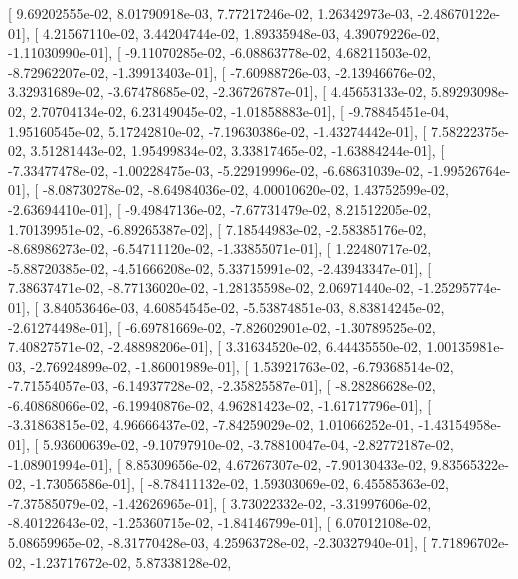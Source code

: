 \documentclass{article}
\begin{document}
       [  9.69202555e-02,   8.01790918e-03,   7.77217246e-02,
          1.26342973e-03,  -2.48670122e-01],
       [  4.21567110e-02,   3.44204744e-02,   1.89335948e-03,
          4.39079226e-02,  -1.11030990e-01],
       [ -9.11070285e-02,  -6.08863778e-02,   4.68211503e-02,
         -8.72962207e-02,  -1.39913403e-01],
       [ -7.60988726e-03,  -2.13946676e-02,   3.32931689e-02,
         -3.67478685e-02,  -2.36726787e-01],
       [  4.45653133e-02,   5.89293098e-02,   2.70704134e-02,
          6.23149045e-02,  -1.01858883e-01],
       [ -9.78845451e-04,   1.95160545e-02,   5.17242810e-02,
         -7.19630386e-02,  -1.43274442e-01],
       [  7.58222375e-02,   3.51281443e-02,   1.95499834e-02,
          3.33817465e-02,  -1.63884244e-01],
       [ -7.33477478e-02,  -1.00228475e-03,  -5.22919996e-02,
         -6.68631039e-02,  -1.99526764e-01],
       [ -8.08730278e-02,  -8.64984036e-02,   4.00010620e-02,
          1.43752599e-02,  -2.63694410e-01],
       [ -9.49847136e-02,  -7.67731479e-02,   8.21512205e-02,
          1.70139951e-02,  -6.89265387e-02],
       [  7.18544983e-02,  -2.58385176e-02,  -8.68986273e-02,
         -6.54711120e-02,  -1.33855071e-01],
       [  1.22480717e-02,  -5.88720385e-02,  -4.51666208e-02,
          5.33715991e-02,  -2.43943347e-01],
       [  7.38637471e-02,  -8.77136020e-02,  -1.28135598e-02,
          2.06971440e-02,  -1.25295774e-01],
       [  3.84053646e-03,   4.60854545e-02,  -5.53874851e-03,
          8.83814245e-02,  -2.61274498e-01],
       [ -6.69781669e-02,  -7.82602901e-02,  -1.30789525e-02,
          7.40827571e-02,  -2.48898206e-01],
       [  3.31634520e-02,   6.44435550e-02,   1.00135981e-03,
         -2.76924899e-02,  -1.86001989e-01],
       [  1.53921763e-02,  -6.79368514e-02,  -7.71554057e-03,
         -6.14937728e-02,  -2.35825587e-01],
       [ -8.28286628e-02,  -6.40868066e-02,  -6.19940876e-02,
          4.96281423e-02,  -1.61717796e-01],
       [ -3.31863815e-02,   4.96666437e-02,  -7.84259029e-02,
          1.01066252e-01,  -1.43154958e-01],
       [  5.93600639e-02,  -9.10797910e-02,  -3.78810047e-04,
         -2.82772187e-02,  -1.08901994e-01],
       [  8.85309656e-02,   4.67267307e-02,  -7.90130433e-02,
          9.83565322e-02,  -1.73056586e-01],
       [ -8.78411132e-02,   1.59303069e-02,   6.45585363e-02,
         -7.37585079e-02,  -1.42626965e-01],
       [  3.73022332e-02,  -3.31997606e-02,  -8.40122643e-02,
         -1.25360715e-02,  -1.84146799e-01],
       [  6.07012108e-02,   5.08659965e-02,  -8.31770428e-03,
          4.25963728e-02,  -2.30327940e-01],
       [  7.71896702e-02,  -1.23717672e-02,   5.87338128e-02,
\end{document}
